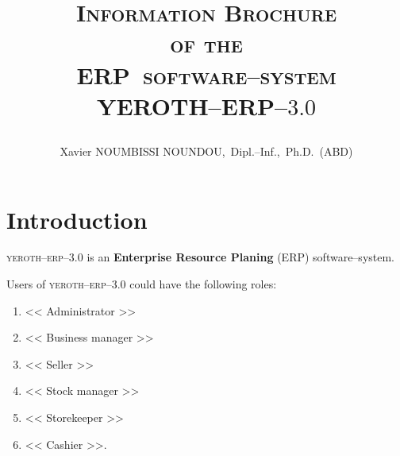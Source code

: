 \documentclass[a4paper, 10pt, twocolumn]{article}
\newcommand{\pos}{ERP~software--system\xspace}
\newcommand{\yerenpos}{\textcolor{yerenColorBlue}{\sc YEROTH--ERP--$3.0$}\xspace}
\newcommand{\myfullacademicname}{Xavier NOUMBISSI NOUNDOU,~Dipl.--Inf.,~Ph.D.~(ABD)\xspace}
\newcommand{\yeren}{\textsc{yeroth--erp--3.0}\xspace}
\newcommand{\administrator}{<< Administrator >>\xspace}
\newcommand{\manager}{<< Business manager >>\xspace}
\newcommand{\seller}{<< Seller >>\xspace}
\newcommand{\inventorystockmanager}{<< Stock manager >>\xspace}
\newcommand{\storekeeper}{<< Storekeeper >>\xspace}
\newcommand{\cashier}{<< Cashier >>\xspace}
\begin{document}
\title{\textcolor{medgreen}{
\vspace{0em}
\textsc{Information Brochure \\
of the \\
\pos \\ \vspace{1em}
\yerenpos}}
\author{\myfullacademicname}
}

\date{} 
\maketitle
\thispagestyle{fancy}



\vspace{-1.5em}
\section{Introduction}
\vspace{-0.3em}
\yeren is an \textbf{Enterprise Resource Planing} (ERP)
software--system. 

Users of \yeren could have the following roles:
\begin{enumerate}[1)]
	\itemsep -0.6em
	\item \administrator
	\item \manager
	\item \seller
	\item \inventorystockmanager
	\item \storekeeper
	\item \cashier.	
\end{enumerate}
\end{document}
